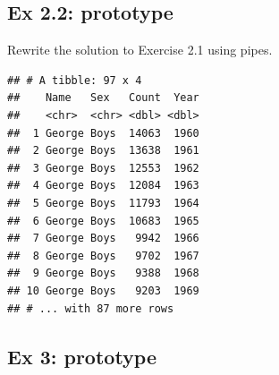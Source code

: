 \documentclass[]{book}
\newenvironment{Shaded}{\begin{snugshade}}{\end{snugshade}}
\newcommand{\KeywordTok}[1]{\textcolor[rgb]{0.13,0.29,0.53}{\textbf{#1}}}
\newcommand{\StringTok}[1]{\textcolor[rgb]{0.31,0.60,0.02}{#1}}
\newcommand{\OperatorTok}[1]{\textcolor[rgb]{0.81,0.36,0.00}{\textbf{#1}}}
\newcommand{\NormalTok}[1]{#1}
\begin{document}
\subsection{Ex 2.2: prototype}\label{ex-2.2-prototype}

Rewrite the solution to Exercise 2.1 using pipes.

\begin{Shaded}
\end{Shaded}

\begin{verbatim}
## # A tibble: 97 x 4
##    Name   Sex   Count  Year
##    <chr>  <chr> <dbl> <dbl>
##  1 George Boys  14063  1960
##  2 George Boys  13638  1961
##  3 George Boys  12553  1962
##  4 George Boys  12084  1963
##  5 George Boys  11793  1964
##  6 George Boys  10683  1965
##  7 George Boys   9942  1966
##  8 George Boys   9702  1967
##  9 George Boys   9388  1968
## 10 George Boys   9203  1969
## # ... with 87 more rows
\end{verbatim}

\subsection{Ex 3: prototype}\label{ex-3-prototype}
\end{document}
